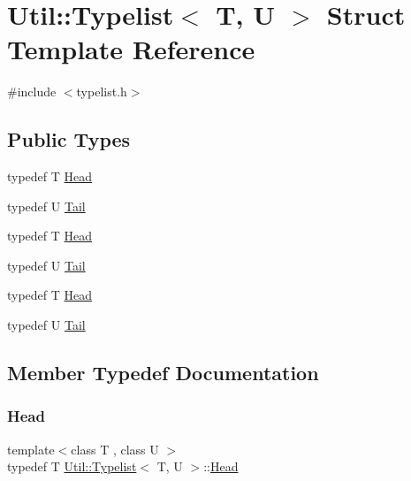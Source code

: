 \hypertarget{structUtil_1_1Typelist}{}\section{Util\+:\+:Typelist$<$ T, U $>$ Struct Template Reference}
\label{structUtil_1_1Typelist}


{\ttfamily \#include $<$typelist.\+h$>$}

\subsection*{Public Types}
\begin{DoxyCompactItemize}
\item 
typedef T \mbox{\hyperlink{structUtil_1_1Typelist_adc631e8685518837efd57d234d33982e}{Head}}
\item 
typedef U \mbox{\hyperlink{structUtil_1_1Typelist_a9c02512c1b76c9340e36855f76ff5f01}{Tail}}
\item 
typedef T \mbox{\hyperlink{structUtil_1_1Typelist_adc631e8685518837efd57d234d33982e}{Head}}
\item 
typedef U \mbox{\hyperlink{structUtil_1_1Typelist_a9c02512c1b76c9340e36855f76ff5f01}{Tail}}
\item 
typedef T \mbox{\hyperlink{structUtil_1_1Typelist_adc631e8685518837efd57d234d33982e}{Head}}
\item 
typedef U \mbox{\hyperlink{structUtil_1_1Typelist_a9c02512c1b76c9340e36855f76ff5f01}{Tail}}
\end{DoxyCompactItemize}


\subsection{Member Typedef Documentation}
\mbox{\label{structUtil_1_1Typelist_adc631e8685518837efd57d234d33982e}} 
\subsubsection{\texorpdfstring{Head}{Head}\hspace{0.1cm}{\footnotesize\ttfamily [1/3]}}
{\footnotesize\ttfamily template$<$class T , class U $>$ \\
typedef T \mbox{\hyperlink{structUtil_1_1Typelist}{Util\+::\+Typelist}}$<$ T, U $>$\+::\mbox{\hyperlink{structUtil_1_1Typelist_adc631e8685518837efd57d234d33982e}{Head}}}

